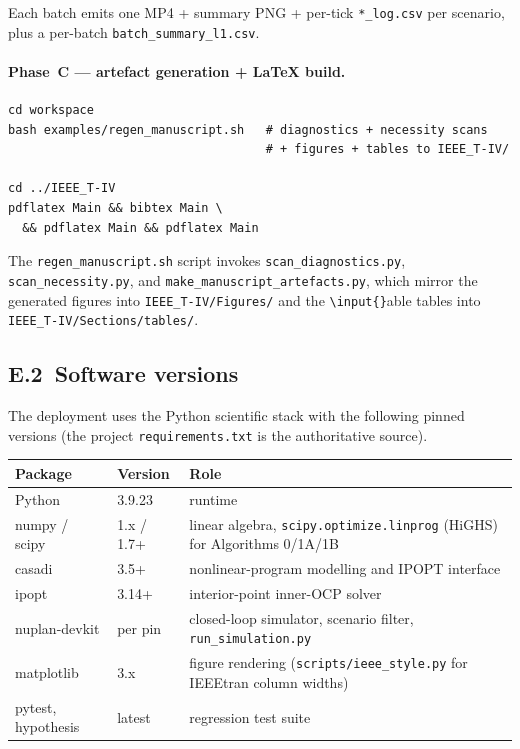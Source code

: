 Each batch emits one MP4 + summary PNG + per-tick \texttt{*\_log.csv} per scenario, plus a per-batch \texttt{batch\_summary\_l1.csv}.

\paragraph{Phase~C --- artefact generation + LaTeX build.}

\begin{verbatim}
cd workspace
bash examples/regen_manuscript.sh   # diagnostics + necessity scans
                                    # + figures + tables to IEEE_T-IV/

cd ../IEEE_T-IV
pdflatex Main && bibtex Main \
  && pdflatex Main && pdflatex Main
\end{verbatim}

The \texttt{regen\_manuscript.sh} script invokes \texttt{scan\_diagnostics.py}, \texttt{scan\_necessity.py}, and \texttt{make\_manuscript\_artefacts.py}, which mirror the generated figures into \texttt{IEEE\_T-IV/Figures/} and the \texttt{\textbackslash input\{\}}able tables into \texttt{IEEE\_T-IV/Sections/tables/}.

\subsection*{E.2\ Software versions}

The deployment uses the Python scientific stack with the following pinned versions (the project \texttt{requirements.txt} is the authoritative source).

\begin{table}[h]
    \centering
    \footnotesize
    \begin{tabularx}{\linewidth}{@{}l l X@{}}
        \toprule
        Package & Version & Role \\
        \midrule
        Python & 3.9.23 & runtime \\
        numpy / scipy & 1.x / 1.7+ & linear algebra, \texttt{scipy.optimize.linprog} (HiGHS) for Algorithms 0/1A/1B \\
        casadi & 3.5+ & nonlinear-program modelling and IPOPT interface \\
        ipopt & 3.14+ & interior-point inner-OCP solver \\
        nuplan-devkit & per pin & closed-loop simulator, scenario filter, \texttt{run\_simulation.py} \\
        matplotlib & 3.x & figure rendering (\texttt{scripts/ieee\_style.py} for IEEEtran column widths) \\
        pytest, hypothesis & latest & regression test suite \\
        \bottomrule
    \end{tabularx}
\end{table}

